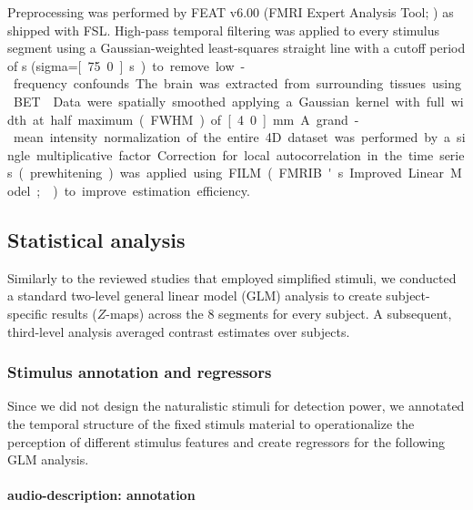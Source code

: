 \documentclass[english]{article}
\begin{document}
Preprocessing was performed by FEAT v6.00 (FMRI Expert Analysis Tool;
\citep{woolrich2001autocorr}) as shipped with FSL.
High-pass temporal filtering was applied to every stimulus segment using a
Gaussian-weighted least-squares straight line with a cutoff period of
\unit[150]{s} (sigma=\unit[75.0]{s}) to remove low-frequency confounds.
The brain was extracted from surrounding tissues using BET \citep{smith2002bet}.
Data were spatially smoothed applying a Gaussian kernel with full width at half
maximum (FWHM) of \unit[4.0]{mm}.
A grand-mean intensity normalization of the entire 4D dataset was performed by a
single multiplicative factor.
Correction for local autocorrelation in the time series (prewhitening) was
applied using FILM (FMRIB's Improved Linear Model; \citep{woolrich2001autocorr})
to improve estimation efficiency.


\subsection{Statistical analysis}



Similarly to the reviewed studies that employed simplified stimuli, we conducted
a standard two-level general linear model (GLM) analysis to create
subject-specific results ($Z$-maps) across the 8 segments for every subject. A
subsequent, third-level analysis averaged contrast estimates over subjects.


\subsubsection{Stimulus annotation and regressors}



Since we did not design the naturalistic stimuli for detection power, we
annotated the temporal structure of the fixed stimuls material to operationalize
the perception of different stimulus features and create regressors for the
following GLM analysis.


\paragraph{audio-description: annotation}
\end{document}
